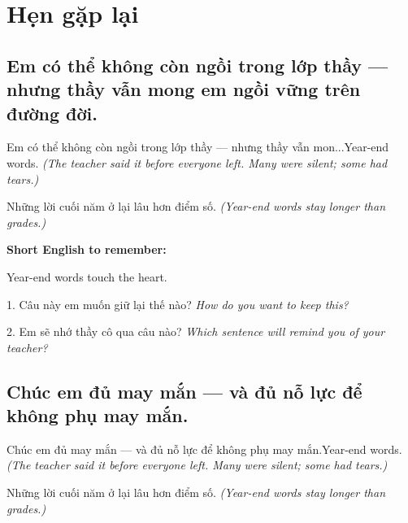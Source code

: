 \chapter{Hẹn gặp lại}


\section{Em có thể không còn ngồi trong lớp thầy — nhưng thầy vẫn mong em ngồi vững trên đường đời.}
\begin{truyen}{Em có thể không còn ngồi trong lớp thầy — nhưng thầy vẫn mon...}{Year-end words.}
\textit{(The teacher said it before everyone left. Many were silent; some had tears.)}
\end{truyen}

\begin{baihoc}
Những lời cuối năm ở lại lâu hơn điểm số.
\textit{(Year-end words stay longer than grades.)}
\end{baihoc}

\begin{ghinhoanh}
\textbf{Short English to remember:}

Year-end words touch the heart.

\end{ghinhoanh}

\begin{tuhocnhanh}
1. Câu này em muốn giữ lại thế nào? \textit{How do you want to keep this?}

2. Em sẽ nhớ thầy cô qua câu nào? \textit{Which sentence will remind you of your teacher?}
\end{tuhocnhanh}
\ngancach


\section{Chúc em đủ may mắn — và đủ nỗ lực để không phụ may mắn.}
\begin{truyen}{Chúc em đủ may mắn — và đủ nỗ lực để không phụ may mắn.}{Year-end words.}
\textit{(The teacher said it before everyone left. Many were silent; some had tears.)}
\end{truyen}

\begin{baihoc}
Những lời cuối năm ở lại lâu hơn điểm số.
\textit{(Year-end words stay longer than grades.)}
\end{baihoc}

